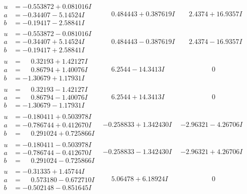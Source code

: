 \documentclass[1p]{elsarticle_modified}
\theoremstyle{definition}
\begin{document}
$$\begin{array}{c|c|c}
\begin{aligned}
u &= -0.553872 + 0.081016 I \\
a &= -0.34407 - 5.14524 I \\
b &= -0.19417 - 2.58841 I\end{aligned}
 & \phantom{-}0.484443 + 0.387619 I & \phantom{-}2.4374 + 16.9357 I \\ \hline\begin{aligned}
u &= -0.553872 - 0.081016 I \\
a &= -0.34407 + 5.14524 I \\
b &= -0.19417 + 2.58841 I\end{aligned}
 & \phantom{-}0.484443 - 0.387619 I & \phantom{-}2.4374 - 16.9357 I \\ \hline\begin{aligned}
u &= \phantom{-}0.32193 + 1.42127 I \\
a &= \phantom{-}0.86794 + 1.40076 I \\
b &= -1.30679 + 1.17931 I\end{aligned}
 & \phantom{-}6.2544 - 14.3413 I & \phantom{-0.000000 } 0 \\ \hline\begin{aligned}
u &= \phantom{-}0.32193 - 1.42127 I \\
a &= \phantom{-}0.86794 - 1.40076 I \\
b &= -1.30679 - 1.17931 I\end{aligned}
 & \phantom{-}6.2544 + 14.3413 I & \phantom{-0.000000 } 0 \\ \hline\begin{aligned}
u &= -0.180411 + 0.503978 I \\
a &= -0.786744 + 0.412670 I \\
b &= \phantom{-}0.291024 + 0.725866 I\end{aligned}
 & -0.258833 + 1.342430 I & -2.96321 - 4.26706 I \\ \hline\begin{aligned}
u &= -0.180411 - 0.503978 I \\
a &= -0.786744 - 0.412670 I \\
b &= \phantom{-}0.291024 - 0.725866 I\end{aligned}
 & -0.258833 - 1.342430 I & -2.96321 + 4.26706 I \\ \hline\begin{aligned}
u &= -0.31335 + 1.45744 I \\
a &= \phantom{-}0.573180 - 0.672710 I \\
b &= -0.502148 - 0.851645 I\end{aligned}
 & \phantom{-}5.06478 + 6.18924 I & \phantom{-0.000000 } 0 \\ \hline\begin{aligned}

\end{aligned}
\end{array}$$
\end{document}
